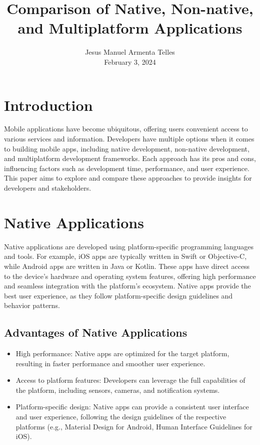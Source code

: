 \documentclass[journal,comsoc]{IEEEtran}
\title{Comparison of Native, Non-native, and Multiplatform Applications}
\author{Jesus Manuel Armenta Telles  \\ \large February 3, 2024}
\begin{document}
	
	\maketitle
	
	\section{Introduction}
	Mobile applications have become ubiquitous, offering users convenient access to various services and information. Developers have multiple options when it comes to building mobile apps, including native development, non-native development, and multiplatform development frameworks. Each approach has its pros and cons, influencing factors such as development time, performance, and user experience. This paper aims to explore and compare these approaches to provide insights for developers and stakeholders.
	
	\section{Native Applications}
	Native applications are developed using platform-specific programming languages and tools. For example, iOS apps are typically written in Swift or Objective-C, while Android apps are written in Java or Kotlin. These apps have direct access to the device's hardware and operating system features, offering high performance and seamless integration with the platform's ecosystem. Native apps provide the best user experience, as they follow platform-specific design guidelines and behavior patterns.
	
	\subsection{Advantages of Native Applications}
	\begin{itemize}
		\item High performance: Native apps are optimized for the target platform, resulting in faster performance and smoother user experience.
		\item Access to platform features: Developers can leverage the full capabilities of the platform, including sensors, cameras, and notification systems.
		\item Platform-specific design: Native apps can provide a consistent user interface and user experience, following the design guidelines of the respective platforms (e.g., Material Design for Android, Human Interface Guidelines for iOS).
	\end{itemize}
	
\end{document}
